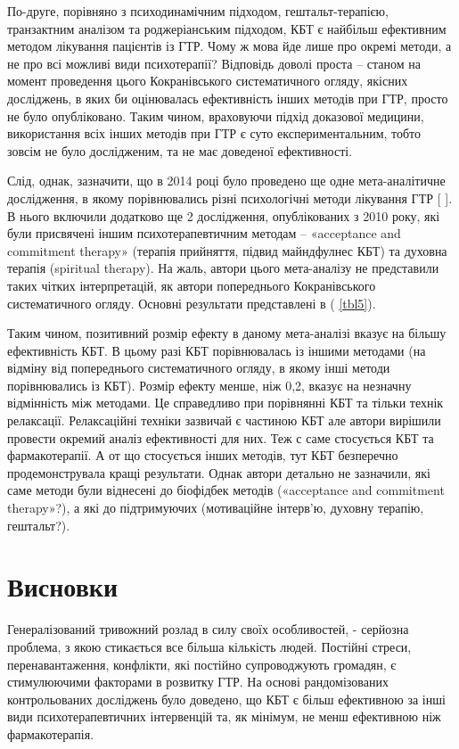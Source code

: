 По-друге, порівняно з психодинамічним підходом, гештальт-терапією, транзактним аналізом та роджеріанським підходом, КБТ є найбільш ефективним методом лікування пацієнтів із ГТР. Чому ж мова йде лише про окремі методи, а не про всі можливі види психотерапії? Відповідь доволі проста – станом на момент проведення цього Кокранівського систематичного огляду, якісних досліджень, в яких би оцінювалась ефективність інших методів при ГТР, просто не було опубліковано. Таким чином, враховуючи підхід доказової медицини, використання всіх інших методів при ГТР є суто експериментальним, тобто зовсім не було дослідженим, та не має доведеної ефективності.

Слід, однак, зазначити, що в 2014 році було проведено ще одне мета-аналітичне дослідження, в якому порівнювались різні психологічні методи лікування ГТР [
\cite{bib25}]. В нього включили додатково ще 2 дослідження, опублікованих з 2010 року, які були присвячені іншим психотерапевтичним методам – «acceptance and commitment therapy» (терапія прийняття, підвид майндфулнес КБТ) та духовна терапія (spiritual therapy). На жаль, автори цього мета-аналізу не представили таких чітких інтерпретацій, як автори попереднього Кокранівського систематичного огляду. Основні результати представлені в (
\ref{tbl5}).

Таким чином, позитивний розмір ефекту в даному мета-аналізі вказує на більшу ефективність КБТ. В цьому разі КБТ порівнювалась із іншими методами (на відміну від попереднього систематичного огляду, в якому інші методи порівнювались із КБТ). Розмір ефекту менше, ніж 0,2, вказує на незначну відмінність між методами. Це справедливо при порівнянні КБТ та тільки технік релаксації. Релаксаційні техніки зазвичай є частиною КБТ але автори вирішили провести окремий аналіз ефективності для них. Теж с саме стосується КБТ та фармакотерапії. А от що стосується інших методів, тут КБТ безперечно продемонструвала кращі результати. Однак автори детально не зазначили, які саме методи були віднесені до біофідбек методів («acceptance and commitment therapy»?), а які до підтримуючих (мотиваційне інтерв’ю, духовну терапію, гештальт?).

\section {Висновки}
Генералізований тривожний розлад в силу своїх особливостей, - серйозна проблема, з якою стикається все більша кількість людей. Постійні стреси, перенавантаження, конфлікти, які постійно супроводжують громадян, є стимулюючими факторами в розвитку ГТР. На основі рандомізованих контрольованих досліджень було доведено, що КБТ є більш ефективною за інші види психотерапевтичних інтервенцій та, як мінімум, не менш ефективною ніж фармакотерапія.

